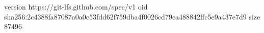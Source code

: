 version https://git-lfs.github.com/spec/v1
oid sha256:2c4388fa87087a0a0c53fdd62f759dba4f0026cd79ea488842ffc5e9a437e7d9
size 87496
